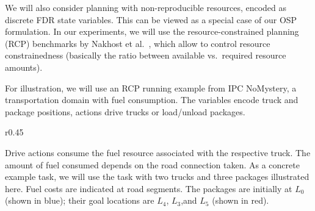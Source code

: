 %
%
We will also consider planning with non-reproducible resources,
encoded as discrete FDR state variables. This can be viewed as a
special case of our OSP formulation. In our experiments, we will use
the resource-constrained planning (RCP) benchmarks by Nakhost et
al.\ , which allow to control
resource constrainedness (basically the ratio between available
vs.\ required resource amounts).

For illustration, we will use an RCP running example from IPC
NoMystery, a transportation domain with fuel consumption. The
variables encode truck and package positions, actions drive trucks or
load/unload packages.
%
\begin{wrapfigure}{r}{0.45\columnwidth}
\vspace{-0.3cm} \hspace{-0.8cm} %
\vspace{-0.3cm}
\end{wrapfigure}
%
Drive actions consume the fuel resource associated with the respective
truck. The amount of fuel consumed depends on the road connection
taken. As a concrete example task, we will use the task with two
trucks and three packages illustrated here. Fuel costs are indicated
at road segments. The packages are initially at $L_0$ (shown in blue);
their goal locations are $L_4$, $L_3$,and $L_5$ (shown in red).
